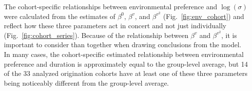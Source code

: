 \documentclass[11pt]{article}
\begin{document}
The cohort-specific relationships between environmental preference and \(\log(\sigma)\) were calculated from the estimates of \(\beta^{0}\), \(\beta^{v}\), and \(\beta^{v^{2}}\) (Fig.~\ref{fig:env_cohort}) and reflect how these three parameters act in concert and not just individually (Fig.~\ref{fig:cohort_series}). Because of the relationship between \(\beta^{v}\) and \(\beta^{v^{2}}\), it is important to consider than together when drawing conclusions from the model. In many cases, the cohort-specific estimated relationship between environmental preference and duration is approximately equal to the group-level average, but 14 of the 33 analyzed origination cohorts have at least one of these three parameters being noticeably different from the group-level average. 
\end{document}
